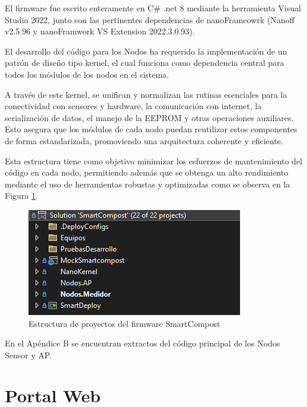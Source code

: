 El firmware \citep{codigoFuente} fue escrito enteramente en C\# .net 8 mediante la herramienta Visual Studio 2022, junto con las pertinentes dependencias de nanoFrameowrk (Nanoff v2.5.96 y nanoFramwork VS Extension 2022.3.0.93).

El desarrollo del código para los Nodos ha requerido la implementación de un patrón de diseño tipo kernel, el cual funciona como dependencia central para todos los módulos de los nodos en el sistema.

A través de este kernel, se unifican y normalizan las rutinas esenciales para la conectividad con sensores y hardware, la comunicación con internet, la serialización de datos, el manejo de la EEPROM y otras operaciones auxiliares. Esto asegura que los módulos de cada nodo puedan reutilizar estos componentes de forma estandarizada, promoviendo una arquitectura coherente y eficiente.

Esta estructura tiene como objetivo minimizar los esfuerzos de mantenimiento del código en cada nodo, permitiendo además que se obtenga un alto rendimiento mediante el uso de herramientas robustas y optimizadas como se observa en la Figura \ref{fig:estructura-codigo-firmware}.

\begin{figure}[H]
    \centering
    \includegraphics[width=0.8\linewidth]{Figures//Firmware/smartcompost_app.png}
    \caption{Estructura de proyectos del firmware SmartCompost}
    \label{fig:estructura-codigo-firmware}
\end{figure}

En el Apéndice B se encuentran extractos del código principal de los Nodos Sensor y AP.

\section{Portal Web}


